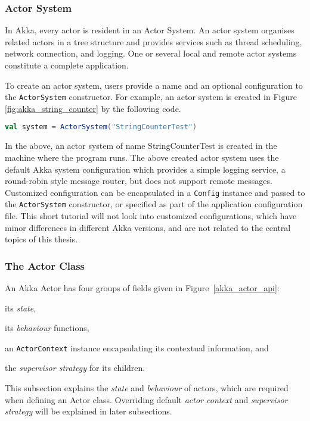 \subsubsection{Actor System}
\label{akka_actor_system}

In Akka, every actor is resident in an Actor System.  An actor system organises 
related actors in a tree structure and provides services such as thread  
scheduling, network connection, and logging.  One or several local and remote 
actor systems constitute a complete application.  

To create an actor system, users provide a  name and an optional configuration 
to the {\tt ActorSystem} constructor.  For example, an actor system is created 
in Figure  
\ref{fig:akka_string_counter} by the following code. 
\begin{lstlisting}[language=scala]
  val system = ActorSystem("StringCounterTest")
\end{lstlisting}

In the above, an actor system of name \textcolor{mauve}{StringCounterTest} is 
created in the machine where the program runs.  The above created actor system 
uses the default Akka system configuration which provides a simple logging 
service, a round-robin style message router, but does not support remote 
messages.  Customized configuration can be encapsulated in a {\tt Config} 
instance and passed to the {\tt ActorSystem} constructor, or specified as part 
of the application configuration file.  This short tutorial will not look into 
customized configurations, which have minor differences in different Akka 
versions, and are not related to the central topics of this thesis.

\subsubsection{The Actor Class}
\label{akka_actor_class}

An Akka Actor has four groups of fields given in Figure~\ref{akka_actor_api}:
\begin{inparaenum}
\item its {\it state}, 
\item its {\it behaviour} functions, 
\item an {\tt ActorContext} instance encapsulating its contextual information,  and
\item the {\it supervisor strategy} for its children. 
\end{inparaenum}
This subsection explains the {\it state} and {\it behaviour} of actors, which 
are required when defining an Actor class.  Overriding default {\it actor 
context} and {\it supervisor strategy} will be explained in later subsections.

